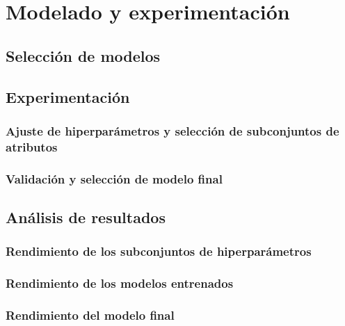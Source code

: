 \chapter{Modelado y experimentación}

\section{Selección de modelos}

\section{Experimentación}

\subsection{Ajuste de hiperparámetros y selección de subconjuntos de atributos}

\subsection{Validación y selección de modelo final}

\section{Análisis de resultados}

\subsection{Rendimiento de los subconjuntos de hiperparámetros}

\subsection{Rendimiento de los modelos entrenados}

\subsection{Rendimiento del modelo final}